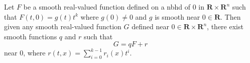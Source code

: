Let $F$ be a smooth real-valued function defined on a nbhd of $0$ in $\mathbf{R} \times \mathbf{R}^n$ such that $F(t, 0) = g(t)t^k$ where $g(0) \neq 0$ and $g$ is smooth near $0 \in \mathbf{R}$. Then given any smooth real-valued function $G$ defined near $0 \in \mathbf{R} \times \mathbf{R}^n$, there exist smooth functions $q$ and $r$ such that
$$G = qF + r$$
near $0$, where $r(t, x) = \sum_{i=0}^{k-1} r_i(x) t^i$.
